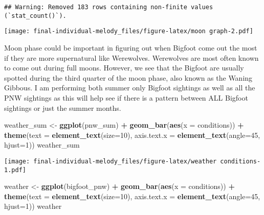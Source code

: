 \documentclass[
]{article}
\newenvironment{Shaded}{\begin{snugshade}}{\end{snugshade}}
\newcommand{\AttributeTok}[1]{\textcolor[rgb]{0.13,0.29,0.53}{#1}}
\newcommand{\DecValTok}[1]{\textcolor[rgb]{0.00,0.00,0.81}{#1}}
\newcommand{\FunctionTok}[1]{\textcolor[rgb]{0.13,0.29,0.53}{\textbf{#1}}}
\newcommand{\NormalTok}[1]{#1}
\newcommand{\OtherTok}[1]{\textcolor[rgb]{0.56,0.35,0.01}{#1}}
\newcommand{\SpecialCharTok}[1]{\textcolor[rgb]{0.81,0.36,0.00}{\textbf{#1}}}
\begin{document}
\begin{verbatim}
## Warning: Removed 183 rows containing non-finite values (`stat_count()`).
\end{verbatim}

\texttt{[image: final-individual-melody\_files/figure-latex/moon graph-2.pdf]}

Moon phase could be important in figuring out when Bigfoot come out the
most if they are more supernatural like Werewolves. Werewolves are most
often known to come out during full moons. However, we see that the
Bigfoot are usually spotted during the third quarter of the moon phase,
also known as the Waning Gibbous. I am performing both summer only
Bigfoot sightings as well as all the PNW sightings as this will help see
if there is a pattern between ALL Bigfoot sightings or just the summer
months.

\begin{Shaded}
\begin{Highlighting}[]
\NormalTok{weather\_sum }\OtherTok{\textless{}{-}} \FunctionTok{ggplot}\NormalTok{(pnw\_sum) }\SpecialCharTok{+} \FunctionTok{geom\_bar}\NormalTok{(}\FunctionTok{aes}\NormalTok{(}\AttributeTok{x =}\NormalTok{ conditions)) }\SpecialCharTok{+}
    \FunctionTok{theme}\NormalTok{(}\AttributeTok{text =} \FunctionTok{element\_text}\NormalTok{(}\AttributeTok{size=}\DecValTok{10}\NormalTok{),}
        \AttributeTok{axis.text.x =} \FunctionTok{element\_text}\NormalTok{(}\AttributeTok{angle=}\DecValTok{45}\NormalTok{, }\AttributeTok{hjust=}\DecValTok{1}\NormalTok{)) }
\NormalTok{weather\_sum}
\end{Highlighting}
\end{Shaded}

\texttt{[image: final-individual-melody\_files/figure-latex/weather conditions-1.pdf]}

\begin{Shaded}
\begin{Highlighting}[]
\NormalTok{weather }\OtherTok{\textless{}{-}} \FunctionTok{ggplot}\NormalTok{(bigfoot\_pnw) }\SpecialCharTok{+} \FunctionTok{geom\_bar}\NormalTok{(}\FunctionTok{aes}\NormalTok{(}\AttributeTok{x =}\NormalTok{ conditions)) }\SpecialCharTok{+}
    \FunctionTok{theme}\NormalTok{(}\AttributeTok{text =} \FunctionTok{element\_text}\NormalTok{(}\AttributeTok{size=}\DecValTok{10}\NormalTok{),}
        \AttributeTok{axis.text.x =} \FunctionTok{element\_text}\NormalTok{(}\AttributeTok{angle=}\DecValTok{45}\NormalTok{, }\AttributeTok{hjust=}\DecValTok{1}\NormalTok{)) }
\NormalTok{weather}
\end{Highlighting}
\end{Shaded}
\end{document}
